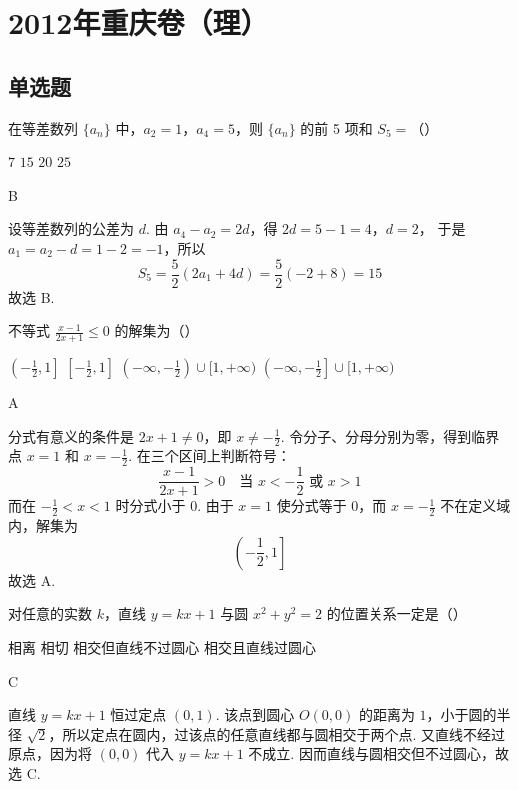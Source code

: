 \chapter{2012年重庆卷（理）}

\section{单选题}

\begin{problem}
在等差数列 \(\{a_{n}\}\) 中，\(a_{2} = 1\)，\(a_{4} = 5\)，则 \(\{a_{n}\}\) 的前 5 项和 \(S_{5} =\)（\quad）

\choices
    {\(7\)}
    {\(15\)}
    {\(20\)}
    {\(25\)}

\begin{answer}
B
\end{answer}

\begin{solution}
设等差数列的公差为 \(d\). 由 \(a_{4}-a_{2}=2d\)，得
\(2d=5-1=4\)，\(d=2\)，
于是 \(a_{1}=a_{2}-d=1-2=-1\)，所以
\[
S_{5}=\frac{5}{2}\left(2a_{1}+4d\right)
=\frac{5}{2}\left(-2+8\right)=15
\]
故选 B.
\end{solution}
\end{problem}

\begin{problem}
不等式 \(\frac{x - 1}{2x + 1} \leqslant 0\) 的解集为（\quad）

\choices
    {\( \left(-\frac{1}{2},1\right] \)}
    {\( \left[-\frac{1}{2},1\right] \)}
    {\(\left(-\infty, -\frac{1}{2}\right) \cup [1, +\infty)\)}
    {\(\left(-\infty, -\frac{1}{2}\right] \cup [1, +\infty)\)}

\begin{answer}
A
\end{answer}

\begin{solution}
分式有意义的条件是 \(2x+1\ne0\)，即 \(x\ne-\frac12\). 令分子、分母分别为零，得到临界点 \(x=1\) 和 \(x=-\frac12\). 在三个区间上判断符号：
\[
\frac{x-1}{2x+1}>0\quad\text{当 }x<-\frac12\text{ 或 }x>1
\]
而在 \(-\frac12<x<1\) 时分式小于 \(0\). 由于 \(x=1\) 使分式等于 \(0\)，而 \(x=-\frac12\) 不在定义域内，解集为
\[
\left(-\frac12,1\right]
\]
故选 A.
\end{solution}
\end{problem}

\begin{problem}
对任意的实数 \(k\)，直线 \(y = kx + 1\) 与圆 \(x^{2} + y^{2} = 2\) 的位置关系一定是（\quad）

\choices
    {相离}
    {相切}
    {相交但直线不过圆心}
    {相交且直线过圆心}

\begin{answer}
C
\end{answer}

\begin{solution}
直线 \(y=kx+1\) 恒过定点 \((0,1)\). 该点到圆心 \(O(0,0)\) 的距离为 \(1\)，小于圆的半径 \(\sqrt2\)，所以定点在圆内，过该点的任意直线都与圆相交于两个点. 又直线不经过原点，因为将 \((0,0)\) 代入 \(y=kx+1\) 不成立. 因而直线与圆相交但不过圆心，故选 C.
\end{solution}
\end{problem}

